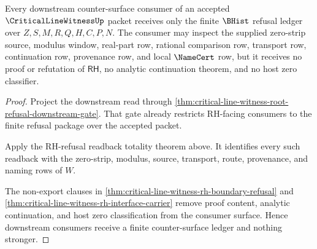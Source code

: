 \begin{theorem}
\label{thm:critical-line-witness-downstream-counter-surface}
Every downstream counter-surface consumer of an accepted $\CriticalLineWitnessUp$ packet receives only the finite $\BHist$ refusal ledger over $Z,S,M,R,Q,H,C,P,N$. The consumer may inspect the supplied zero-strip source, modulus window, real-part row, rational comparison row, transport row, continuation row, provenance row, and local $\NameCert$ row, but it receives no proof or refutation of $\mathsf{RH}$, no analytic continuation theorem, and no host zero classifier.
\end{theorem}
\begin{proof}
Project the downstream read through \autoref{thm:critical-line-witness-root-refusal-downstream-gate}. That gate already restricts RH-facing consumers to the finite refusal package over the accepted packet.

Apply the RH-refusal readback totality theorem above. It identifies every such readback with the zero-strip, modulus, source, transport, route, provenance, and naming rows of $W$.

The non-export clauses in \autoref{thm:critical-line-witness-rh-boundary-refusal} and \autoref{thm:critical-line-witness-rh-interface-carrier} remove proof content, analytic continuation, and host zero classification from the consumer surface. Hence downstream consumers receive a finite counter-surface ledger and nothing stronger.
\end{proof}
